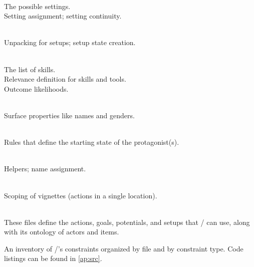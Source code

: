 \begin{table}[!p]
\begin{minipage}[t][0.935\textheight]{\dimexpr0.5\textwidth-1.2em}
\begin{hangparas}{0.8em}{1}
   \\
  \cg{[content]} The possible settings. \\
  \cg{[representational]} Setting assign\-ment; setting continuity.

   \\
  \cg{[representational]} Unpacking for setups; setup state creation.

   \\
  \cg{[content]} The list of skills. \\
  \cg{[representational]} Relevance definition for skills and tools. \\
  \cg{[constituent]} Outcome likelihoods.

   \\
  \cg{[representational]} Surface properties like names and genders.

   \\
  \cg{[content]} Rules that define the starting state of the protagonist(s).

   \\
  \cg{[other]} Helpers; name assignment.

   \\
  \cg{[constituent]} Scoping of vignettes (actions in a single location).

   \\
  \cg{[content]} These files define the actions, goals, potentials, and setups that \dunyazad/ can use, along with its ontology of actors and items.
\end{hangparas}%
\end{minipage}%
\caption[\dunyazad/ constraints inventory]{An inventory of \dunyazad/'s constraints organized by file and by constraint type. Code listings can be found in \cref{ap:src}.}
\label{tab:dunyazad-constraints-inventory}
\end{table}

